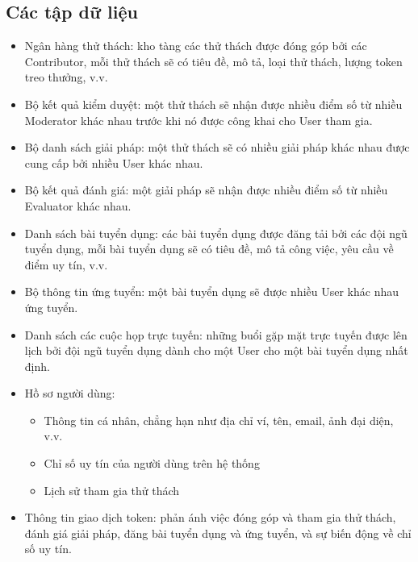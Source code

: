 \subsection{Các tập dữ liệu}
\begin{itemize}
  \item Ngân hàng thử thách: kho tàng các thử thách được đóng góp bởi các Contributor, mỗi thử thách sẽ có tiêu đề, mô tả, loại thử thách, lượng token treo thưởng, v.v.
  \item Bộ kết quả kiểm duyệt: một thử thách sẽ nhận được nhiều điểm số từ nhiều Moderator khác nhau trước khi nó được công khai cho User tham gia.
  \item Bộ danh sách giải pháp: một thử thách sẽ có nhiều giải pháp khác nhau được cung cấp bởi nhiều User khác nhau.
  \item Bộ kết quả đánh giá: một giải pháp sẽ nhận được nhiều điểm số từ nhiều Evaluator khác nhau.
  \item Danh sách bài tuyển dụng: các bài tuyển dụng được đăng tải bởi các đội ngũ tuyển dụng, mỗi bài tuyển dụng sẽ có tiêu đề, mô tả công việc, yêu cầu về điểm uy tín, v.v.
  \item Bộ thông tin ứng tuyển: một bài tuyển dụng sẽ được nhiều User khác nhau ứng tuyển.
  \item Danh sách các cuộc họp trực tuyến: những buổi gặp mặt trực tuyến được lên lịch bởi đội ngũ tuyển dụng dành cho một User cho một bài tuyển dụng nhất định.
  \item Hồ sơ người dùng:
  \begin{itemize}
    \item Thông tin cá nhân, chẳng hạn như địa chỉ ví, tên, email, ảnh đại diện, v.v.
    \item Chỉ số uy tín của người dùng trên hệ thống
    \item Lịch sử tham gia thử thách
  \end{itemize}
  \item Thông tin giao dịch token: phản ánh việc đóng góp và tham gia thử thách, đánh giá giải pháp, đăng bài tuyển dụng và ứng tuyển, và sự biến động về chỉ số uy tín.
\end{itemize}

